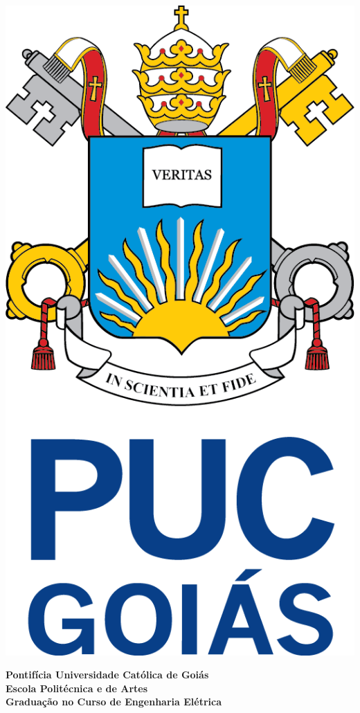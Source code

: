 \documentclass[a4paper, 12pt]{article}
\begin{document}
\thispagestyle{empty}

\begin{center} %
    \includegraphics[scale=0.3]{PUCLOGO.png}

    \large
    \textbf{Pontifícia Universidade Católica de Goiás}\\
    \textbf{Escola Politécnica e de Artes}\\
    \textbf{Graduação no Curso de Engenharia Elétrica}\\
    \vspace{3cm}



\end{center}
\end{document}
